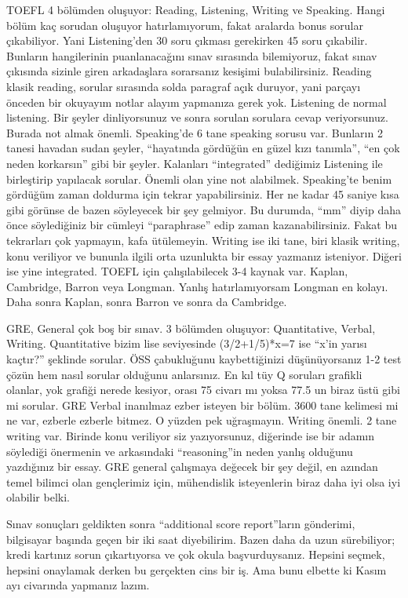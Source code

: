 \documentclass[12pt]{article}
\begin{document}
TOEFL 4 bölümden oluşuyor: Reading, Listening, Writing ve Speaking. Hangi bölüm kaç sorudan oluşuyor hatırlamıyorum, fakat aralarda bonus sorular çıkabiliyor. Yani Listening'den 30 soru çıkması gerekirken 45 soru çıkabilir. Bunların hangilerinin puanlanacağını sınav sırasında bilemiyoruz, fakat sınav çıkısında sizinle giren arkadaşlara sorarsanız kesişimi bulabilirsiniz. Reading klasik reading, sorular sırasında solda paragraf açık duruyor, yani parçayı önceden bir okuyayım notlar alayım yapmanıza gerek yok. Listening de normal listening. Bir şeyler dinliyorsunuz ve sonra sorulan sorulara cevap veriyorsunuz. Burada not almak önemli. Speaking'de 6 tane speaking sorusu var. Bunların 2 tanesi havadan sudan şeyler, “hayatında gördüğün en güzel kızı tanımla'', “en çok neden korkarsın'' gibi bir şeyler. Kalanları ``integrated'' dediğimiz Listening ile birleştirip yapılacak sorular. Önemli olan yine not alabilmek. Speaking'te benim gördüğüm zaman doldurma için tekrar yapabilirsiniz. Her ne kadar 45 saniye kısa gibi görünse de bazen söyleyecek bir şey gelmiyor. Bu durumda, “mm” diyip daha önce söylediğiniz bir cümleyi ``paraphrase'' edip zaman kazanabilirsiniz.  Fakat bu tekrarları çok yapmayın, kafa ütülemeyin. Writing ise iki tane, biri klasik writing, konu veriliyor ve bununla ilgili orta uzunlukta bir essay yazmanız isteniyor. Diğeri ise yine integrated. TOEFL için çalışılabilecek 3-4 kaynak var. Kaplan, Cambridge, Barron veya Longman. Yanlış hatırlamıyorsam Longman en kolayı. Daha sonra Kaplan, sonra Barron ve sonra da Cambridge.  

GRE, General çok boş bir sınav. 3 bölümden oluşuyor: Quantitative, Verbal, Writing. Quantitative bizim lise seviyesinde (3/2+1/5)*x=7 ise “x’in yarısı kaçtır?'' şeklinde sorular. ÖSS çabukluğunu kaybettiğinizi düşünüyorsanız 1-2 test çözün hem nasıl sorular olduğunu anlarsınız. En kıl tüy Q soruları grafikli olanlar, yok grafiği nerede kesiyor, orası 75 civarı mı yoksa 77.5 un biraz üstü gibi mi sorular. GRE Verbal inanılmaz ezber isteyen bir bölüm. 3600 tane kelimesi mi ne var, ezberle ezberle bitmez. O yüzden pek uğraşmayın. Writing önemli. 2 tane writing var. Birinde konu veriliyor siz yazıyorsunuz, diğerinde ise bir adamın söylediği önermenin ve arkasındaki ``reasoning''in neden yanlış olduğunu yazdığınız bir essay. GRE general çalışmaya değecek bir şey değil, en azından temel bilimci olan gençlerimiz için, mühendislik isteyenlerin biraz daha iyi olsa iyi olabilir belki.  

Sınav sonuçları geldikten sonra ``additional score report''ların gönderimi, bilgisayar başında geçen bir iki saat diyebilirim. Bazen daha da uzun sürebiliyor; kredi kartınız sorun çıkartıyorsa ve çok okula başvurduysanız. Hepsini seçmek, hepsini onaylamak derken bu gerçekten cins bir iş. Ama bunu elbette ki Kasım ayı civarında yapmanız lazım. 
\end{document}
